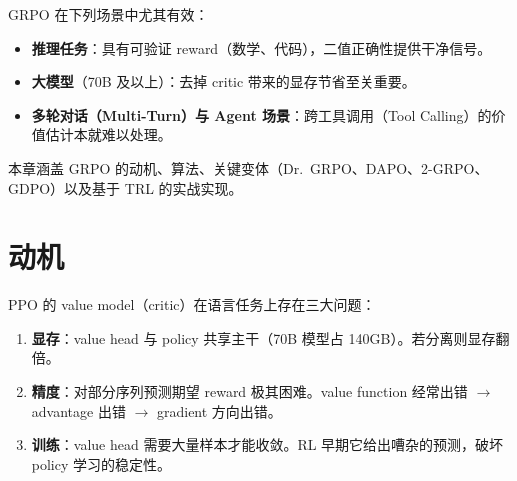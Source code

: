 GRPO 在下列场景中尤其有效：

\begin{itemize}
  \item \textbf{推理任务}：具有可验证 reward（数学、代码），二值正确性提供干净信号。
  \item \textbf{大模型}（70B 及以上）：去掉 critic 带来的显存节省至关重要。
  \item \textbf{多轮对话（Multi-Turn）与 Agent 场景}：跨工具调用（Tool Calling）的价值估计本就难以处理。
\end{itemize}

本章涵盖 GRPO 的动机、算法、关键变体（Dr.~GRPO、DAPO、2-GRPO、GDPO）以及基于 TRL 的实战实现。

\section{动机}
\label{motivation-dup2}

PPO 的 value model（critic）在语言任务上存在三大问题：

\begin{enumerate}
  \item \textbf{显存}：value head 与 policy 共享主干（70B 模型占 140GB）。若分离则显存翻倍。
  \item \textbf{精度}：对部分序列预测期望 reward 极其困难。value function 经常出错 $\rightarrow$ advantage 出错 $\rightarrow$ gradient 方向出错。
  \item \textbf{训练}：value head 需要大量样本才能收敛。RL 早期它给出嘈杂的预测，破坏 policy 学习的稳定性。
\end{enumerate}

